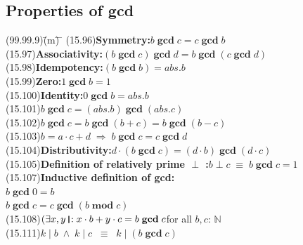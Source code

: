 \documentclass{amsart}
\newcommand{\lgap}{2pt}                             %
\newcommand{\llgap}{6pt}                            %
\newcommand{\equivs}{\ensuremath{\;\equiv\;}}       %
\newcommand{\equivss}{\ensuremath{\;\;\equiv\;\;}}  %
\newcommand{\impls}{\ensuremath{\;\Rightarrow\;}}   %
\newcommand{\mymod}{\;\textbf{mod}\;}
\newcommand{\mygcd}{\;\textbf{gcd}\;}
\newcommand{\thedr}{\rule[-.25ex]{.32mm}{1.75ex}}   %
\newcommand{\drrb}{\;\thedr\,{:}\;}                 %
\newcommand{\ext}{\exists}                          %
\begin{document}
\subsection*{Properties of gcd}
\begin{tabbing}
(99.99.9)\;\=(m)\;\= \makebox[2in]{ } \= \kill
(15.96)\>\textbf{Symmetry:}\quad $b \mygcd c = c \mygcd b$\\[\lgap]
(15.97)\>\textbf{Associativity:}\quad $(b \mygcd c) \mygcd d = b \mygcd (c \mygcd d)$\\[\lgap]
(15.98)\>\textbf{Idempotency:}\quad $(b \mygcd b) = abs.b$\\[\lgap]
(15.99)\>\textbf{Zero:}\quad $1 \mygcd b = 1$\\[\lgap]
(15.100)\>\textbf{Identity:}\quad $0 \mygcd b = abs.b$\\[\lgap]
(15.101)\>$b \mygcd c = (abs.b) \mygcd (abs.c)$\\[\lgap]
(15.102)\>$b \mygcd c = b \mygcd (b + c) = b \mygcd (b - c)$\\[\lgap]
(15.103)\>$b = a\cdot c + d \impls b \mygcd c = c \mygcd d$\\[\lgap]
(15.104)\>\textbf{Distributivity:}\quad $d \cdot (b \mygcd c) = (d \cdot b) \mygcd (d\cdot c)$\\[\llgap]
(15.105)\>\textbf{Definition of relatively prime $\perp$ :}\quad $b \perp c \equivs b \mygcd c = 1$\\[\llgap]
(15.107)\>\textbf{Inductive definition of gcd:}\\[\lgap]
       \> $b \mygcd 0 = b$\\[\lgap]
       \> $b \mygcd c = c \mygcd (b \mymod c)$\\[\llgap]
(15.108)\>$(\ext x, y\drrb x\cdot b + y\cdot c = b \mygcd c$\quad for all $b,c$: $\mathbb{N}$\\[\lgap]
(15.111)\>$k \mid b \;\land\; k \mid c \equivss k \mid (b \mygcd c)$\\[\lgap]
\end{tabbing}
\end{document}
